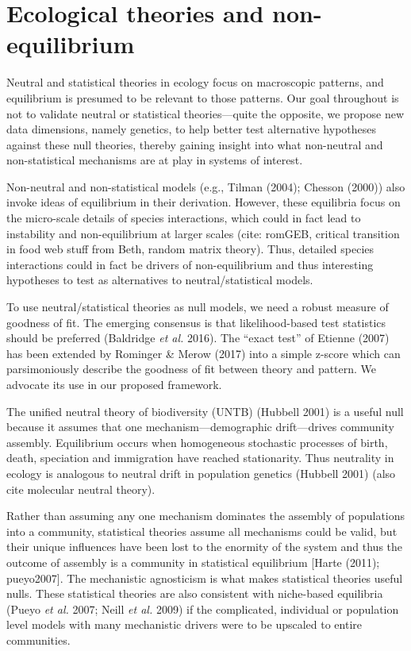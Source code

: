 \documentclass[
]{article}
\begin{document}
\hypertarget{ecological-theories-and-non-equilibrium}{%
\section{Ecological theories and
non-equilibrium}\label{ecological-theories-and-non-equilibrium}}

Neutral and statistical theories in ecology focus on macroscopic
patterns, and equilibrium is presumed to be relevant to those patterns.
Our goal throughout is not to validate neutral or statistical
theories---quite the opposite, we propose new data dimensions, namely
genetics, to help better test alternative hypotheses against these null
theories, thereby gaining insight into what non-neutral and
non-statistical mechanisms are at play in systems of interest.

Non-neutral and non-statistical models (e.g., Tilman (2004); Chesson
(2000)) also invoke ideas of equilibrium in their derivation. However,
these equilibria focus on the micro-scale details of species
interactions, which could in fact lead to instability and
non-equilibrium at larger scales (cite: romGEB, critical transition in
food web stuff from Beth, random matrix theory). Thus, detailed species
interactions could in fact be drivers of non-equilibrium and thus
interesting hypotheses to test as alternatives to neutral/statistical
models.

To use neutral/statistical theories as null models, we need a robust
measure of goodness of fit. The emerging consensus is that
likelihood-based test statistics should be preferred (Baldridge \emph{et
al.} 2016). The ``exact test'' of Etienne (2007) has been extended by
Rominger \& Merow (2017) into a simple z-score which can parsimoniously
describe the goodness of fit between theory and pattern. We advocate its
use in our proposed framework.

The unified neutral theory of biodiversity (UNTB) (Hubbell 2001) is a
useful null because it assumes that one mechanism---demographic
drift---drives community assembly. Equilibrium occurs when homogeneous
stochastic processes of birth, death, speciation and immigration have
reached stationarity. Thus neutrality in ecology is analogous to neutral
drift in population genetics (Hubbell 2001) (also cite molecular neutral
theory).

Rather than assuming any one mechanism dominates the assembly of
populations into a community, statistical theories assume all mechanisms
could be valid, but their unique influences have been lost to the
enormity of the system and thus the outcome of assembly is a community
in statistical equilibrium {[}Harte (2011); pueyo2007{]}. The
mechanistic agnosticism is what makes statistical theories useful nulls.
These statistical theories are also consistent with niche-based
equilibria (Pueyo \emph{et al.} 2007; Neill \emph{et al.} 2009) if the
complicated, individual or population level models with many mechanistic
drivers were to be upscaled to entire communities.
\end{document}
